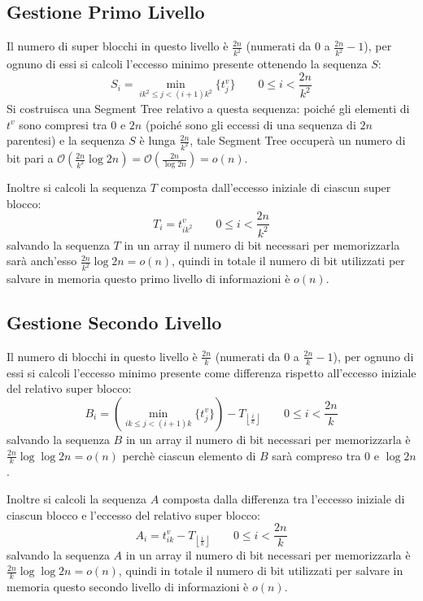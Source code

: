 \documentclass{article}
\begin{document}
\subsection{Gestione Primo Livello}
Il numero di super blocchi in questo livello è $\frac{2n}{k^2}$ (numerati da $0$ a $\frac{2n}{k^2}-1$), per ognuno di essi si calcoli l'eccesso minimo presente ottenendo la sequenza $S$:
    $$
    S_i = \min_{ik^2 \leq j < (i+1)k^2}\{t^v_j\} \qquad 0\leq i < \frac{2n}{k^2}
    $$
Si costruisca una Segment Tree relativo a questa sequenza: poiché gli elementi di $t^v$ sono compresi tra $0$ e $2n$ (poiché sono gli eccessi di una sequenza di $2n$ parentesi) e la sequenza $S$ è lunga $\frac{2n}{k^2}$, tale Segment Tree occuperà un numero di bit pari a $\mathcal{O}(\frac{2n}{k^2}\log{2n})=\mathcal{O}(\frac{2n}{\log{2n}})=o(n)$.

Inoltre si calcoli la sequenza $T$ composta dall'eccesso iniziale di ciascun super blocco:
    $$
    T_i = t^v_{ik^2} \qquad 0\leq i < \frac{2n}{k^2}
    $$
salvando la sequenza $T$ in un array il numero di bit necessari per memorizzarla sarà anch'esso $\frac{2n}{k^2}\log{2n}=o(n)$, quindi in totale il numero di bit utilizzati per salvare in memoria questo primo livello di informazioni è $o(n)$.

\subsection{Gestione Secondo Livello}
Il numero di blocchi in questo livello è $\frac{2n}{k}$ (numerati da $0$ a $\frac{2n}{k}-1$), per ognuno di essi si calcoli l'eccesso minimo presente come differenza rispetto all'eccesso iniziale del relativo super blocco:
    $$
    B_i = \left(\min_{ik \leq j < (i+1)k}\{t^v_j\}\right)-T_{\left\lfloor{\frac{i}{k}}\right\rfloor} \qquad 0\leq i < \frac{2n}{k}
    $$
salvando la sequenza $B$ in un array il numero di bit necessari per memorizzarla è $\frac{2n}{k}\log{\log{2n}}=o(n)$ perchè ciascun elemento di $B$ sarà compreso tra $0$ e $\log{2n}$.

Inoltre si calcoli la sequenza $A$ composta dalla differenza tra l'eccesso iniziale di ciascun blocco e l'eccesso del relativo super blocco:
    $$
    A_i = t^v_{ik}-T_{\left\lfloor{\frac{i}{k}}\right\rfloor} \qquad 0\leq i < \frac{2n}{k}
    $$
salvando la sequenza $A$ in un array il numero di bit necessari per memorizzarla è $\frac{2n}{k}\log{\log{2n}}=o(n)$, quindi in totale il numero di bit utilizzati per salvare in memoria questo secondo livello di informazioni è $o(n)$.
\end{document}
